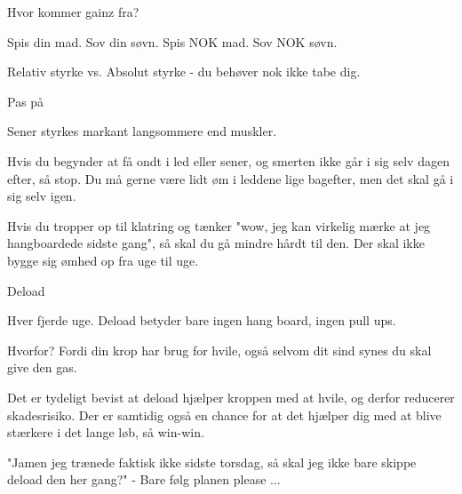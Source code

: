 \begin{multicols}{2}

  \begin{tList}{Hvor kommer gainz fra?}

  \item Spis din mad. Sov din søvn. Spis NOK mad. Sov NOK søvn.
  \item Relativ styrke vs. Absolut styrke - du behøver nok ikke tabe dig.
  \end{tList}

  \begin{tList}{Pas på}
  \item Sener styrkes markant langsommere end muskler.

  \item Hvis du begynder at få ondt i led eller sener, og smerten
    ikke går i sig selv dagen efter, så stop. Du må gerne være lidt
    øm i leddene lige bagefter, men det skal gå i sig selv igen.

  \item Hvis du tropper op til klatring og tænker "wow, jeg kan
    virkelig mærke at jeg hangboardede sidste gang", så skal du gå
    mindre hårdt til den. Der skal ikke bygge sig ømhed op fra uge til uge.
  \end{tList}

  \begin{tList}{Deload}

  \item Hver fjerde uge. Deload betyder bare ingen hang board, ingen pull ups.

  \item Hvorfor?
    Fordi din krop har brug for hvile, også selvom dit sind synes
    du skal give den gas.

  \item Det er tydeligt bevist at deload hjælper kroppen med at
    hvile, og derfor reducerer skadesrisiko. Der er samtidig også en
    chance for at det hjælper dig med at blive stærkere i det lange
    løb, så win-win.

  \item "Jamen jeg trænede faktisk ikke sidste torsdag, så skal jeg
    ikke bare skippe deload den her gang?"
    - Bare følg planen please ...
  \end{tList}


\end{multicols}
